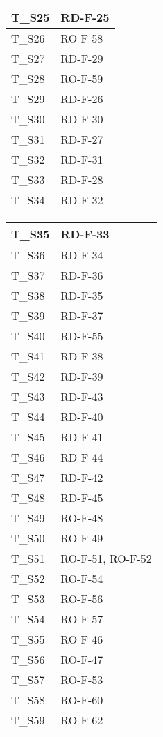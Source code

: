 \begin{center}
\begin{tabular}{|m{6em}|m{8em}|}
        \hline
        T\_S25 & RD-F-25\\
        \hline
        T\_S26 & RO-F-58\\
        \hline
        T\_S27 & RD-F-29\\
        \hline
        T\_S28 & RO-F-59\\
        \hline
        T\_S29 & RD-F-26\\
        \hline
        T\_S30 & RD-F-30\\
        \hline
        T\_S31 & RD-F-27\\
        \hline
        T\_S32 & RD-F-31\\
        \hline
        T\_S33 & RD-F-28\\
        \hline
        T\_S34 & RD-F-32\\
        \hline
    \end{tabular}
    \newpage
    \renewcommand{\arraystretch}{1.8}
    \begin{tabular}{|m{6em}|m{8em}|}
        \hline
        T\_S35 & RD-F-33\\
        \hline
        T\_S36 & RD-F-34\\
        \hline
        T\_S37 & RD-F-36\\
        \hline
        T\_S38 & RD-F-35\\
        \hline
        T\_S39 & RD-F-37\\
        \hline
        T\_S40 & RD-F-55\\
        \hline
        T\_S41 & RD-F-38\\
        \hline
        T\_S42 & RD-F-39\\
        \hline
        T\_S43 & RD-F-43\\
        \hline
        T\_S44 & RD-F-40\\
        \hline
        T\_S45 & RD-F-41\\
        \hline
        T\_S46 & RD-F-44\\
        \hline
        T\_S47 & RD-F-42\\
        \hline
        T\_S48 & RD-F-45\\
        \hline
        T\_S49 & RO-F-48\\
        \hline
        T\_S50 & RO-F-49\\
        \hline
        T\_S51 & RO-F-51, RO-F-52\\
        \hline
        T\_S52 & RO-F-54\\
        \hline
        T\_S53 & RO-F-56\\
        \hline
        T\_S54 & RO-F-57\\
        \hline
        T\_S55 & RO-F-46\\
        \hline
        T\_S56 & RO-F-47\\
        \hline
        T\_S57 & RO-F-53\\
        \hline
        T\_S58 & RO-F-60\\
        \hline
        T\_S59 & RO-F-62\\
        \hline
    \end{tabular}
\end{center}